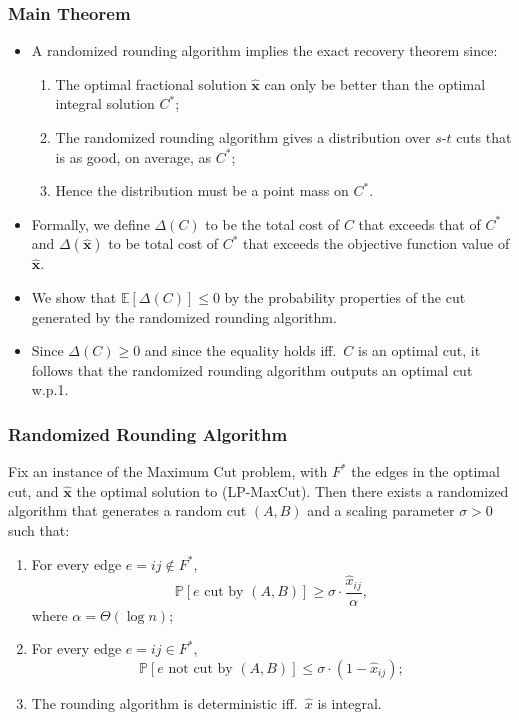 \documentclass{beamer}
\newcommand{\EE}{\mathbb{E}}
\newcommand{\PP}{\mathbb{P}}
\begin{document}
    \begin{frame}
        \frametitle{Main Theorem}

        \begin{itemize}
            \item A randomized rounding algorithm implies the exact recovery theorem since: \pause
            \begin{enumerate}
                \item The optimal fractional solution $\mathbf{\hat x}$ can only be better than the optimal integral solution $C^*$; \pause
                \item The randomized rounding algorithm gives a distribution over $s$-$t$ cuts that is as good, on average, as $C^*$; \pause
                \item Hence the distribution must be a point mass on $C^*$.
            \end{enumerate}
            \pause
            \item Formally, we define $\Delta(C)$ to be the total cost of $C$ that exceeds that of $C^*$ and $\Delta(\mathbf{\hat x})$ to be total cost of $C^*$ that exceeds the objective function value of $\mathbf{\hat x}$. \pause
            \item We show that $\EE[\Delta(C)] \leq 0$ by the probability properties of the cut generated by the randomized rounding algorithm. \pause
            \item Since $\Delta(C) \geq 0$ and since the equality holds iff.\ $C$ is an optimal cut, it follows that the randomized rounding algorithm outputs an optimal cut w.p.1.
        \end{itemize}
    \end{frame}

    \begin{frame}
        \frametitle{Randomized Rounding Algorithm}
    
        \begin{lemma}
            Fix an instance of the {\sc Maximum Cut} problem, with $F^*$ the edges in the optimal cut, and $\mathbf{\hat x}$ the optimal solution to {\sc (LP-MaxCut)}. Then there exists a randomized algorithm that generates a random cut $(A, B)$ and a scaling parameter $\sigma > 0$ such that:
            \begin{enumerate}
                \item For every edge $e = ij \not \in F^*$,
                $$ \PP[\text{$e$ cut by $(A, B)$}] \geq \sigma \cdot \frac{\hat x_{ij}}{\alpha}, $$
                where $\alpha = \Theta(\log n)$;
                \item For every edge $e = ij \in F^*$,
                $$ \PP[\text{$e$ not cut by $(A, B)$}] \leq \sigma \cdot (1 - \hat x_{ij}); $$
                \item The rounding algorithm is deterministic iff.\ $\hat x$ is integral.
            \end{enumerate}
        \end{lemma}
    \end{frame}
\end{document}
